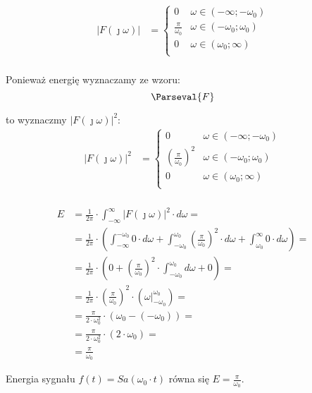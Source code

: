 \begin{task}
\begin{align*}
\left|F(\jmath \omega)\right| &= \begin{cases}
0 & \omega \in \left( -\infty; -\omega_0 \right) \\
\frac{\pi}{\omega_0} & \omega \in \left(-\omega_0; \omega_0 \right) \\
0 & \omega \in \left(\omega_0; \infty \right) \\
\end{cases}\\
\end{align*}

Ponieważ energię wyznaczamy ze wzoru:
\begin{equation}
\Parseval{F}
\end{equation}

to wyznaczmy $\left|F(\jmath \omega)\right|^2$:
\begin{align*}
\left|F(\jmath \omega)\right|^2 &= \begin{cases}
0 & \omega \in \left( -\infty; -\omega_0 \right) \\
\left(\frac{\pi}{\omega_0}\right)^2 & \omega \in \left(-\omega_0; \omega_0 \right) \\
0 & \omega \in \left(\omega_0; \infty \right) \\
\end{cases}\\
\end{align*}

\begin{align*}
E &= \frac{1}{2\pi} \cdot \int_{-\infty}^{\infty} \left|F(\jmath \omega)\right|^2 \cdot d\omega=\\
&=\frac{1}{2\pi} \cdot \left(\int_{-\infty}^{-\omega_0} 0 \cdot d\omega + \int_{-\omega_0}^{\omega_0} \left(\frac{\pi}{\omega_0}\right)^2 \cdot d\omega + \int_{\omega_0}^{\infty} 0 \cdot d\omega\right)=\\
&=\frac{1}{2\pi} \cdot \left(0 + \left(\frac{\pi}{\omega_0}\right)^2 \cdot \int_{-\omega_0}^{\omega_0} d\omega + 0\right)=\\
&=\frac{1}{2\pi} \cdot \left(\frac{\pi}{\omega_0}\right)^2 \cdot \left( \left.\omega \right|_{-\omega_0}^{\omega_0}\right)=\\
&=\frac{\pi}{2 \cdot \omega_0^2} \cdot \left(\omega_0 -(-\omega_0)\right)=\\
&=\frac{\pi}{2 \cdot \omega_0^2} \cdot \left(2 \cdot \omega_0\right)=\\
&=\frac{\pi}{\omega_0}
\end{align*}

Energia sygnału $f(t)=Sa\left(\omega_0 \cdot t\right)$ równa się $E=\frac{\pi}{\omega_0}$.

\end{task}

